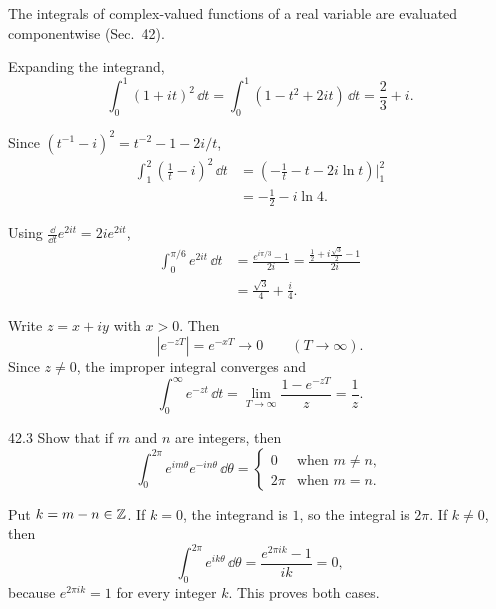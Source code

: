 \documentclass[11pt,oneside]{article}
\begin{document}
\begin{solution}
The integrals of complex-valued functions of a real variable are evaluated componentwise (Sec.~42).
\begin{exercisesubparts}
    \item Expanding the integrand,
    \[
        \int_0^1(1+it)^2\,\dd t
        =\int_0^1(1-t^2+2it)\,\dd t
        =\boxed{\frac23+i}.
    \]
    \item Since \((t^{-1}-i)^2=t^{-2}-1-2i/t\),
    \[
    \begin{aligned}
        \int_1^2\left(\frac1t-i\right)^2\,\dd t
        &=\left(-\frac1t-t-2i\ln t\right)\bigg|_1^2\\
        &=\boxed{-\frac12-i\ln4}.
    \end{aligned}
    \]
    \item Using \(\frac{\dd}{\dd t}e^{2it}=2ie^{2it}\),
    \[
    \begin{aligned}
        \int_0^{\pi/6}e^{2it}\,\dd t
        &=\frac{e^{i\pi/3}-1}{2i}
         =\frac{\frac12+i\frac{\sqrt3}{2}-1}{2i}\\
        &=\boxed{\frac{\sqrt3}{4}+\frac i4}.
    \end{aligned}
    \]
    \item Write \(z=x+iy\) with \(x>0\). Then
    \[
        \left|e^{-zT}\right|=e^{-xT}\longrightarrow0
        \qquad(T\to\infty).
    \]
    Since \(z\ne0\), the improper integral converges and
    \[
        \int_0^\infty e^{-zt}\,\dd t
        =\lim_{T\to\infty}\frac{1-e^{-zT}}z
        =\boxed{\frac1z}.
    \]
\end{exercisesubparts}
\end{solution}

\begin{exercise}{42.3}
Show that if \(m\) and \(n\) are integers, then
\[
    \int_0^{2\pi}e^{im\theta}e^{-in\theta}\,\dd\theta
    =\begin{cases}
        0&\text{when }m\ne n, \\
        2\pi&\text{when }m=n.
      \end{cases}
\]
\end{exercise}

\begin{solution}
Put \(k=m-n\in\mathbb{Z}\). If \(k=0\), the integrand is \(1\), so the integral is \(2\pi\). If \(k\ne0\), then
\[
    \int_0^{2\pi}e^{ik\theta}\,\dd\theta
    =\frac{e^{2\pi ik}-1}{ik}=0,
\]
because \(e^{2\pi ik}=1\) for every integer \(k\). This proves both cases.
\end{solution}
\end{document}
